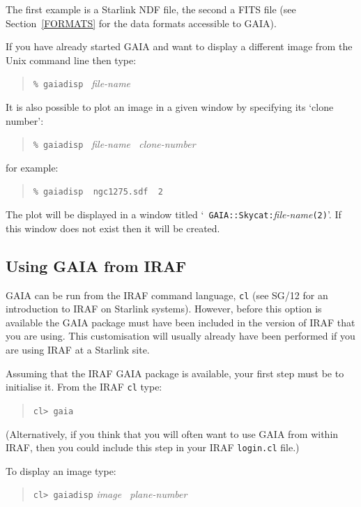 \documentclass[twoside,11pt]{article}
\newcommand{\xref}[3]{#1}
\begin{document}
The first example is a Starlink NDF file, the second a FITS file (see
Section~\ref{FORMATS} for the data formats accessible to GAIA).

If you have already started GAIA and want to display a different image
from the Unix command line then type:

\begin{quote}
{\tt \%  gaiadisp} {\it ~file-name}
\end{quote}

It is also possible to plot an image in a given window by specifying its
`clone number':

\begin{quote}
{\tt \%  gaiadisp} {\it ~file-name ~clone-number}
\end{quote}

for example:

\begin{quote}
{\tt \%  gaiadisp ~ngc1275.sdf ~2}
\end{quote}

The plot will be displayed in a window titled `{\tt
GAIA::Skycat:}{\it file-name}\/{\tt (2)}'.  If this window does not exist
then it will be created.

\subsection{Using GAIA from IRAF}

GAIA can be run from the IRAF command language, {\tt cl} (see
\xref{SG/12}{sg12}{}\cite{SG12} for an introduction to IRAF on Starlink
systems).  However, before this option is available the GAIA package must
have been included in the version of IRAF that you are using.  This
customisation will usually already have been performed if you are using
IRAF at a Starlink site.

Assuming that the IRAF GAIA package is available, your first step must
be to initialise it.  From the IRAF {\tt cl} type:

\begin{quote}
{\tt cl>  gaia}
\end{quote}

(Alternatively, if you think that you will often want to use GAIA from
within IRAF, then you could include this step in your IRAF {\tt login.cl}
file.)

To display an image type:

\begin{quote}
{\tt cl>  gaiadisp} {\it image ~plane-number}
\end{quote}
\end{document}
